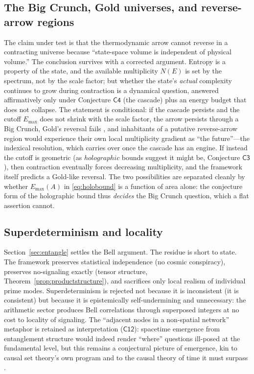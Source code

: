\subsection{The Big Crunch, Gold universes, and reverse-arrow regions}

The claim under test is that the thermodynamic arrow cannot reverse in a contracting universe
because ``state-space volume is independent of physical volume.'' The conclusion survives
with a corrected argument. Entropy is a property of the state, and
the available multiplicity $N(E)$ is set by the spectrum, not by the scale factor; but
whether the state's \emph{actual} complexity continues to grow during contraction is a
dynamical question, answered affirmatively only under Conjecture $\mathsf{C4}$ (the
cascade) plus an energy budget that does not collapse. The statement is conditional:
if the cascade persists and the cutoff $E_{\max}$ does not shrink with the scale factor,
the arrow persists through a Big Crunch, Gold's reversal fails \cite{carroll2010}, and
inhabitants of a putative reverse-arrow region would experience their own local
multiplicity gradient as ``the future''---the indexical resolution, which
carries over once the cascade has an engine. If instead the cutoff is geometric (as
$holographic$ bounds suggest it might be, Conjecture $\mathsf{C3}$), then contraction
eventually forces decreasing multiplicity, and the framework itself predicts a Gold-like
reversal. The two possibilities are separated cleanly by whether $E_{\max}(A)$ in
\eqref{eq:holobound} is a function of area alone: the conjecture form of the holographic
bound thus \emph{decides} the Big Crunch question, which a flat
assertion cannot.

\subsection{Superdeterminism and locality}

Section~\ref{sec:entangle} settles the Bell argument. The residue is short
to state. The framework preserves statistical independence (no cosmic conspiracy), preserves
no-signaling exactly (tensor structure, Theorem~\ref{prop:productstructure}), and
sacrifices only local realism of individual prime modes. Superdeterminism is rejected not
because it is inconsistent (it is consistent) but because it is epistemically
self-undermining and unnecessary: the arithmetic sector produces Bell correlations through
superposed integers at no cost to locality of signaling. The ``adjacent nodes in a
non-spatial network'' metaphor is retained as interpretation ($\mathsf{C12}$): spacetime
emergence from entanglement structure would indeed render ``where'' questions ill-posed at
the fundamental level, but this remains a conjectural picture of emergence, kin to causal
set theory's own program \cite{sorkin2003} and to the causal theory of time it must
surpass \cite{malament1977}.
